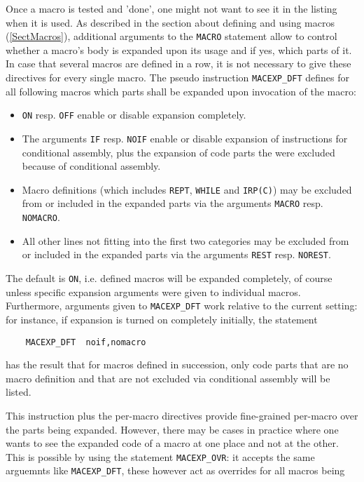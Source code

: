 \documentclass[12pt,twoside]{report}
\newcommand{\tty}[1]{{\tt #1}}
\begin{document}
Once a macro is tested and 'done', one might not want to see it
in the listing when it is used.  As described in the section about
defining and using macros (\ref{SectMacros}), additional arguments to
the \tty{MACRO} statement allow to control whether a macro's body is
expanded upon its usage and if yes, which parts of it.  In case that
several macros are defined in a row, it is not necessary to give
these directives for every single macro.  The pseudo instruction
\tty{MACEXP\_DFT} defines for all following macros which parts shall
be expanded upon invocation of the macro:
\begin{itemize}
\item{\tty{ON} resp. \tty{OFF} enable or disable expansion
      completely.}
\item{The arguments \tty{IF} resp. \tty{NOIF} enable or disable
      expansion of instructions for conditional assembly, plus
      the expansion of code parts the were excluded because of
      conditional assembly.}
\item{Macro definitions (which includes \tty{REPT}, \tty{WHILE}
      and \tty{IRP(C)}) may be excluded from or included in the
      expanded parts via the arguments \tty{MACRO} resp.
      \tty{NOMACRO}.}
\item{All other lines not fitting into the first two categories
      may be excluded from or included in the expanded parts via
      the arguments \tty{REST} resp. \tty{NOREST}.}
\end{itemize}
The default is \tty{ON}, i.e. defined macros will be expanded
completely, of course unless specific expansion arguments were given
to individual macros.  Furthermore, arguments given to
\tty{MACEXP\_DFT} work relative to the current setting: for instance,
if expansion is turned on completely initially, the statement
\begin{verbatim}
	MACEXP_DFT  noif,nomacro
\end{verbatim}
has the result that for macros defined in succession, only code parts
that are no macro definition and that are not excluded via
conditional assembly will be listed.
\par
This instruction plus the per-macro directives provide fine-grained
per-macro over the parts being expanded.  However, there may be cases
in practice where one wants to see the expanded code of a macro at
one place and not at the other.  This is possible by using the
statement \tty{MACEXP\_OVR}: it accepts the same arguemnts like
\tty{MACEXP\_DFT}, these however act as overrides for all macros being
\end{document}
